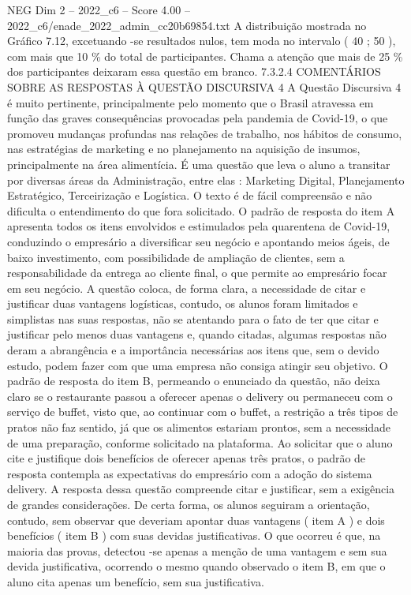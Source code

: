 \begin{textsample}{NEG Dim 2 – 2022\_c6 – Score 4.00 – 2022\_c6/enade\_2022\_admin\_cc20b69854.txt}
A distribuição mostrada no Gráfico 7.12, excetuando -se resultados nulos, tem moda no intervalo ( 40 ; 50 ), com mais que 10 \% do total de participantes.
Chama a atenção que mais de 25 \% dos participantes deixaram essa questão em branco. 7.3.2.4 COMENTÁRIOS SOBRE AS RESPOSTAS À QUESTÃO DISCURSIVA 4 A Questão Discursiva 4 é muito pertinente, principalmente pelo momento que o Brasil atravessa em função das graves consequências provocadas pela pandemia de Covid-19, o que promoveu mudanças profundas nas relações de trabalho, nos hábitos de consumo, nas estratégias de marketing e no planejamento na aquisição de insumos, principalmente na área alimentícia.
É uma questão que leva o aluno a transitar por diversas áreas da Administração, entre elas : Marketing Digital, Planejamento Estratégico, Terceirização e Logística.
O texto é de fácil compreensão e não dificulta o entendimento do que fora solicitado.
O padrão de resposta do item A apresenta todos os itens envolvidos e estimulados pela quarentena de Covid-19, conduzindo o empresário a diversificar seu negócio e apontando meios ágeis, de baixo investimento, com possibilidade de ampliação de clientes, sem a responsabilidade da entrega ao cliente final, o que permite ao empresário focar em seu negócio.
A questão coloca, de forma clara, a necessidade de citar e justificar duas vantagens logísticas, contudo, os alunos foram limitados e simplistas nas suas respostas, não se atentando para o fato de ter que citar e justificar pelo menos duas vantagens e, quando citadas, algumas respostas não deram a abrangência e a importância necessárias aos itens que, sem o devido estudo, podem fazer com que uma empresa não consiga atingir seu objetivo.
O padrão de resposta do item B, permeando o enunciado da questão, não deixa claro se o restaurante passou a oferecer apenas o delivery ou permaneceu com o serviço de buffet, visto que, ao continuar com o buffet, a restrição a três tipos de pratos não faz sentido, já que os alimentos estariam prontos, sem a necessidade de uma preparação, conforme solicitado na plataforma.
Ao solicitar que o aluno cite e justifique dois benefícios de oferecer apenas três pratos, o padrão de resposta contempla as expectativas do empresário com a adoção do sistema delivery.
A resposta dessa questão compreende citar e justificar, sem a exigência de grandes considerações.
De certa forma, os alunos seguiram a orientação, contudo, sem observar que deveriam apontar duas vantagens ( item A ) e dois benefícios ( item B ) com suas devidas justificativas.
O que ocorreu é que, na maioria das provas, detectou -se apenas a menção de uma vantagem e sem sua devida justificativa, ocorrendo o mesmo quando observado o item B, em que o aluno cita apenas um benefício, sem sua justificativa.

\end{textsample}
